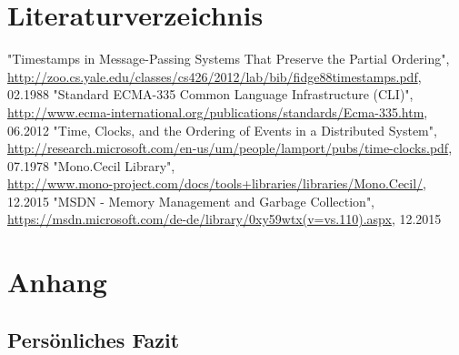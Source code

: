 \documentclass[10pt,a4paper]{article}
\begin{document}
\section*{Literaturverzeichnis}
\newcommand\oldsection{}
\let\oldsection=\section
\renewcommand{\section}[2]{}
\begin{thebibliography}{xxxxxxxxxxxxx}
"Timestamps in Message-Passing Systems That Preserve the Partial Ordering", \href{http://zoo.cs.yale.edu/classes/cs426/2012/lab/bib/fidge88timestamps.pdf}{http://zoo.cs.yale.edu/classes/cs426/2012/lab/bib/fidge88timestamps.pdf}, 02.1988
"Standard ECMA-335 Common Language Infrastructure (CLI)", \href{http://www.ecma-international.org/publications/standards/Ecma-335.htm}{http://www.ecma-international.org/publications/standards/Ecma-335.htm}, 06.2012
"Time, Clocks, and the Ordering of Events in a Distributed System", \href{http://research.microsoft.com/en-us/um/people/lamport/pubs/time-clocks.pdf}{http://research.microsoft.com/en-us/um/people/lamport/pubs/time-clocks.pdf}, 07.1978
"Mono.Cecil Library",\\ \href{http://www.mono-project.com/docs/tools+libraries/libraries/Mono.Cecil/}{http://www.mono-project.com/docs/tools+libraries/libraries/Mono.Cecil/}, 12.2015
"MSDN - Memory Management and Garbage Collection", \href{https://msdn.microsoft.com/de-de/library/0xy59wtx(v=vs.110).aspx}{https://msdn.microsoft.com/de-de/library/0xy59wtx(v=vs.110).aspx}, 12.2015
\end{thebibliography}
\let\section=\oldsection
\newpage
\section*{Anhang}
\subsection*{Persönliches Fazit}
\end{document}
